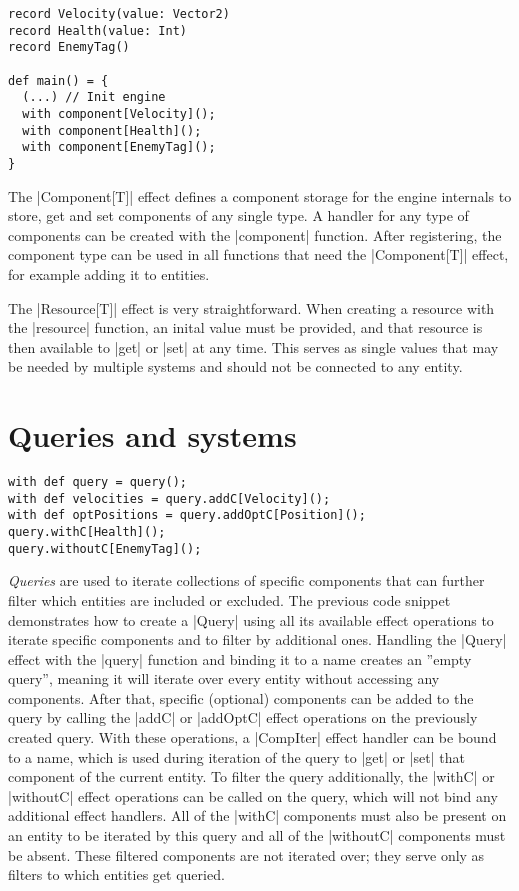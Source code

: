 \begin{lstlisting}[caption=Register components example]
record Velocity(value: Vector2)
record Health(value: Int)
record EnemyTag()

def main() = {
  (...) // Init engine
  with component[Velocity]();
  with component[Health]();
  with component[EnemyTag]();
}
\end{lstlisting}

The |Component[T]| effect defines a component storage for the engine internals to store, get and set components of any single type. A handler for any type of components can be created with the |component| function. After registering, the component type can be used in all functions that need the |Component[T]| effect, for example adding it to entities.

The |Resource[T]| effect is very straightforward. When creating a resource with the |resource| function, an inital value must be provided, and that resource is then available to |get| or |set| at any time. This serves as single values that may be needed by multiple systems and should not be connected to any entity.

\section{Queries and systems}

\begin{lstlisting}[caption=Query creation example]
with def query = query();
with def velocities = query.addC[Velocity]();
with def optPositions = query.addOptC[Position]();
query.withC[Health]();
query.withoutC[EnemyTag]();
\end{lstlisting}

\textit{Queries} are used to iterate collections of specific components that can further filter which entities are included or excluded. The previous code snippet demonstrates how to create a |Query| using all its available effect operations to iterate specific components and to filter by additional ones. Handling the |Query| effect with the |query| function and binding it to a name creates an ''empty query'', meaning it will iterate over every entity without accessing any components. After that, specific (optional) components can be added to the query by calling the |addC| or |addOptC| effect operations on the previously created query. With these operations, a |CompIter| effect handler can be bound to a name, which is used during iteration of the query to |get| or |set| that component of the current entity. To filter the query additionally, the |withC| or |withoutC| effect operations can be called on the query, which will not bind any additional effect handlers. All of the |withC| components must also be present on an entity to be iterated by this query and all of the |withoutC| components must be absent. These filtered components are not iterated over; they serve only as filters to which entities get queried.

